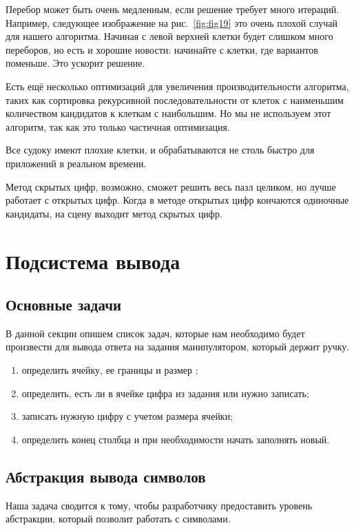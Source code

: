 Перебор может быть очень медленным, если решение требует много итераций. Например, следующее изображение на рис.~\ref{fig:fig19} это очень плохой случай для нашего алгоритма. Начиная с левой верхней клетки будет слишком много переборов, но есть и хорошие новости: начинайте с клетки, где вариантов поменьше. Это ускорит решение.

Есть ещё несколько оптимизаций для увеличения производительности алгоритма, таких как сортировка рекурсивной последовательности от клеток с наименьшим количеством кандидатов к клеткам с наибольшим. Но мы не используем этот алгоритм, так как это только частичная оптимизация.

Все судоку имеют плохие клетки, и обрабатываются не столь быстро для приложений в реальном времени. 

Метод скрытых цифр, возможно, сможет решить весь пазл целиком, но лучше работает с открытых цифр. Когда в методе открытых цифр кончаются одиночные кандидаты, на сцену выходит метод скрытых цифр.

\section{Подсистема вывода}

\subsection{Основные задачи}

В данной секции опишем список задач, которые нам необходимо будет произвести для вывода ответа на задания манипулятором, который держит ручку.

\begin{enumerate}
  \item определить ячейку, ее границы и размер ;
  \item определить, есть ли в ячейке цифра из задания или нужно записать;
  \item записать нужную цифру с учетом размера ячейки;
  \item определить конец столбца и при необходимости начать заполнять новый.
\end{enumerate}

\subsection{Абстракция вывода символов}

Наша задача сводится к тому, чтобы разработчику предоставить уровень абстракции, который позволит работать с символами.

